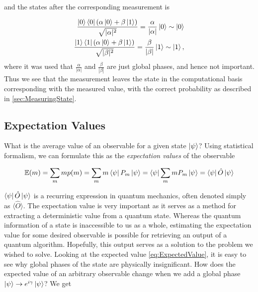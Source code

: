 and the states after the corresponding measurement is 


\begin{equation}\label{eq:CompBasisMeasurement}
\begin{aligned}
    \frac{\ket{0}\bra{0}(\alpha \ket{0} + \beta \ket{1})}{\sqrt{|\alpha|^2}} = 
    \frac{\alpha}{|\alpha|} \ket{0} \sim \ket{0} \\
    \frac{\ket{1}\bra{1}(\alpha \ket{0} + \beta \ket{1})}{\sqrt{|\beta|^2}} = 
    \frac{\beta}{|\beta|} \ket{1} \sim \ket{1},
\end{aligned}
\end{equation}
where it was used that $\frac{\alpha}{|\alpha|}$ and $\frac{\beta}{|\beta|}$ are just global phases, and hence not important. Thus we see that the measurement leaves the state in the computational basis corresponding with the measured value, with the correct probability as described in \autoref{sec:MeasuringState}.

\subsection{Expectation Values}\label{sec:ExpectationValues}

What is the average value of an observable for a given state $\ket{\psi}$? Using statistical formalism, we can formulate this as the \emph{expectation values} of the observable

\begin{equation}\label{eq:ExpectedValue}
    \mathbb{E}(m) = \sum_m m p(m) = \sum_m m \bra{\psi}P_m\ket{\psi} = \bra{\psi}\sum_m m P_m\ket{\psi} = \bra{\psi}\hat{O}\ket{\psi}
\end{equation}

$\bra{\psi}\hat{O}\ket{\psi}$ is a recurring expression in quantum mechanics, often denoted simply as $\langle \hat{O} \rangle$. The expectation value is very important as it serves as a method for extracting a deterministic value from a quantum state. Whereas the quantum information of a state is inaccessible to us as a whole, estimating the expectation value for some desired observable is possible for retrieving an output of a quantum algorithm. Hopefully, this output serves as a solution to the problem we wished to solve. Looking at the expected value \autoref{eq:ExpectedValue}, it is easy to see why global phases of the state are physically insignificant. How does the expected value of an arbitrary observable change when we add a global phase $\ket{\psi} \rightarrow e^{i\gamma}\ket{\psi}$? We get

